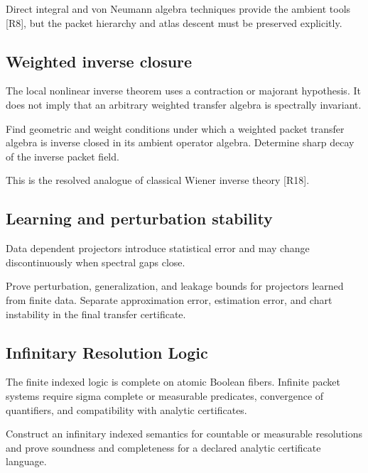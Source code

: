 \documentclass{aomart}
\theoremstyle{definition}
\theoremstyle{remark}
\newcommand{\Rcite}[1]{\textup{[#1]}}
\begin{document}
Direct integral and von Neumann algebra techniques provide the ambient tools \Rcite{R8}, but the packet hierarchy and atlas descent must be preserved explicitly.

\subsection{Weighted inverse closure}

The local nonlinear inverse theorem uses a contraction or majorant hypothesis. It does not imply that an arbitrary weighted transfer algebra is spectrally invariant.

\begin{problem}\label{prob:wiener}
Find geometric and weight conditions under which a weighted packet transfer algebra is inverse closed in its ambient operator algebra. Determine sharp decay of the inverse packet field.
\end{problem}

This is the resolved analogue of classical Wiener inverse theory \Rcite{R18}.

\subsection{Learning and perturbation stability}

Data dependent projectors introduce statistical error and may change discontinuously when spectral gaps close.

\begin{problem}\label{prob:learning}
Prove perturbation, generalization, and leakage bounds for projectors learned from finite data. Separate approximation error, estimation error, and chart instability in the final transfer certificate.
\end{problem}

\subsection{Infinitary Resolution Logic}

The finite indexed logic is complete on atomic Boolean fibers. Infinite packet systems require sigma complete or measurable predicates, convergence of quantifiers, and compatibility with analytic certificates.

\begin{problem}\label{prob:infinite_logic}
Construct an infinitary indexed semantics for countable or measurable resolutions and prove soundness and completeness for a declared analytic certificate language.
\end{problem}
\end{document}
